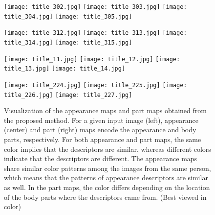 \documentclass{llncs}
\begin{document}
\begin{figure}[t]
\centering
	\begin{minipage}{0.99\linewidth}
	\begin{minipage}{0.24\linewidth}
\centering
      \texttt{[image: title\_302.jpg]}
      \texttt{[image: title\_303.jpg]}
      \texttt{[image: title\_304.jpg]}
      \texttt{[image: title\_305.jpg]}
    \end{minipage}
	\begin{minipage}{0.24\linewidth}
\centering
      \texttt{[image: title\_312.jpg]}
      \texttt{[image: title\_313.jpg]}
      \texttt{[image: title\_314.jpg]}
      \texttt{[image: title\_315.jpg]}
    \end{minipage}
	\begin{minipage}{0.24\linewidth}
\centering
      \texttt{[image: title\_11.jpg]}
      \texttt{[image: title\_12.jpg]}
      \texttt{[image: title\_13.jpg]}
      \texttt{[image: title\_14.jpg]}
    \end{minipage}
	\begin{minipage}{0.24\linewidth}
\centering
      \texttt{[image: title\_224.jpg]}
      \texttt{[image: title\_225.jpg]}
      \texttt{[image: title\_226.jpg]}
      \texttt{[image: title\_227.jpg]}
    \end{minipage}

    \end{minipage}
\vspace{-.2cm}
\caption{Visualization of the appearance maps  and part maps  obtained from the proposed method. For a given input image (left), appearance (center) and part (right) maps encode the appearance and body parts, respectively. For both appearance and part maps, the same color implies that the descriptors are similar, whereas different colors indicate that the descriptors are different. The appearance maps share similar color patterns among the images from the same person, which means that the patterns of appearance descriptors are similar as well. In the part maps, the color differs depending on the location of the body parts where the descriptors came from. (Best viewed in color)}
\label{fig:vis}
\vspace{-.1cm}
\end{figure}
\end{document}
